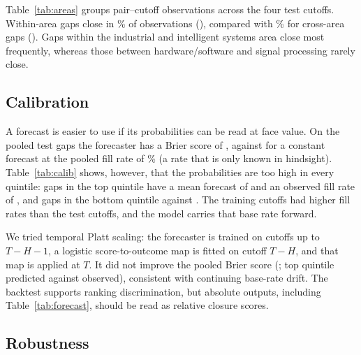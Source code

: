\documentclass[runningheads]{llncs}
\begin{document}
Table~\ref{tab:areas} groups \pooledN{} pair--cutoff observations across the four test cutoffs. Within-area gaps close in \withinRate{}\% of observations (\withinN{}), compared with \acrossRate{}\% for cross-area gaps (\acrossN{}). Gaps within the industrial and intelligent systems area close most frequently, whereas those between hardware/software and signal processing rarely close.

\subsection{Calibration}
\label{sec:calib}

\begin{table}[t]
\centering
\caption{Calibration of the learned forecaster on the \pooledN{} pooled test gaps, by quintile of the predicted probability.}
\label{tab:calib}
\scriptsize

\end{table}

A forecast is easier to use if its probabilities can be read at face value. On the pooled test gaps the forecaster has a Brier score of \brier{}, against \brierBase{} for a constant forecast at the pooled fill rate of \pooledRate{}\% (a rate that is only known in hindsight). Table~\ref{tab:calib} shows, however, that the probabilities are too high in every quintile: gaps in the top quintile have a mean forecast of \relTopP{} and an observed fill rate of \relTopObs{}, and gaps in the bottom quintile \relLowP{} against \relLowObs{}. The training cutoffs had higher fill rates than the test cutoffs, and the model carries that base rate forward.

We tried temporal Platt scaling: the forecaster is trained on cutoffs up to $T{-}H{-}1$, a logistic score-to-outcome map is fitted on cutoff $T{-}H$, and that map is applied at $T$. It did not improve the pooled Brier score (\brierCal{}; top quintile \relCalTopP{} predicted against \relCalTopObs{} observed), consistent with continuing base-rate drift. The backtest supports ranking discrimination, but absolute outputs, including Table~\ref{tab:forecast}, should be read as relative closure scores.

\subsection{Robustness}
\label{sec:robust}

\begin{table}[t]
\centering
\caption{Mean AUC over the four test cutoffs under alternative definitions of gap and closure.}
\label{tab:robust}
\scriptsize

\end{table}
\end{document}
